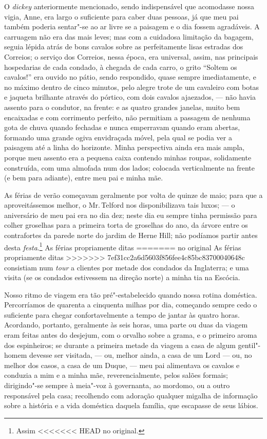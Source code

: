 {{{{{{{{{{{{%
O \textit{dickey} anteriormente mencionado, sendo indispensável que
acomodasse nossa vigia, Anne, era largo o suficiente para caber duas
pessoas, já que meu pai também poderia sentar"-se ao ar livre se a
paisagem e o dia fossem agradáveis. A carruagem não era das mais leves;
mas com a cuidadosa limitação da bagagem, seguia lépida atrás de bons
cavalos sobre as perfeitamente lisas estradas dos Correios; o serviço
dos Correios, nessa época, era universal, assim, nas principais
hospedarias de cada condado, à chegada de cada carro, o grito ``Soltem
os cavalos!'' era ouvido no pátio, sendo respondido, quase sempre
imediatamente, e no máximo dentro de cinco minutos, pelo alegre trote de
um cavaleiro com botas e jaqueta brilhante através do pórtico, com dois
cavalos ajaezados, --- não havia assento para o condutor, na frente: e as
quatro grandes janelas, muito bem encaixadas e com corrimento perfeito,
não permitiam a passagem de nenhuma gota de chuva quando fechadas e
nunca emperravam quando eram abertas, formando uma grande ogiva
envidraçada móvel, pela qual se podia ver a paisagem até a linha do
horizonte. Minha perspectiva ainda era mais ampla, porque meu assento
era a pequena caixa contendo minhas roupas, solidamente construída, com
uma almofada num dos lados; colocada verticalmente na frente (e bem para
adiante), entre meu pai e minha mãe.

As férias de verão começavam geralmente por volta de quinze de maio;
para que a aproveitássemos melhor, o Mr.\,Telford nos disponibilizava tais
luxos; --- o aniversário de meu pai era no dia dez; neste dia eu sempre
tinha permissão para colher groselhas para a primeira torta de groselhas
do ano, da árvore entre os contrafortes da parede norte do jardim de
Herne Hill; não podíamos partir antes desta \textit{festa}.\footnote{Assim
<<<<<<< HEAD
  no original.} As férias propriamente ditas
=======
  no original  As férias propriamente ditas
>>>>>>> 7ef31cc2a6d5603f856fee4c85bc83700040648c
consistiam num \textit{tour} a clientes por metade dos condados da
Inglaterra; e uma visita (se os condados estivessem na direção norte) a
minha tia na Escócia.

Nosso ritmo de viagem era tão pré"-estabelecido quando nossa rotina
doméstica. Percorríamos de quarenta a cinquenta milhas por dia,
começando sempre cedo o suficiente para chegar confortavelmente a tempo
de jantar às quatro horas. Acordando, portanto, geralmente às seis
horas, uma parte ou duas da viagem eram feitas antes do desjejum, com o
orvalho sobre a grama, e o primeiro aroma dos espinheiros; se durante a
primeira metade da viagem a casa de algum gentil"-homem devesse ser
visitada, --- ou, melhor ainda, a casa de um Lord --- ou, no melhor dos
casos, a casa de um Duque, --- meu pai alimentava os cavalos e conduzia a
mim e a minha mãe, reverencialmente, pelos salões formais; dirigindo"-se
sempre à meia"-voz à governanta, ao mordomo, ou a outro responsável pela
casa; recolhendo com adoração qualquer migalha de informação sobre a
história e a vida doméstica daquela família, que escapasse de seus
lábios.

}}}}}}}}}}}}
